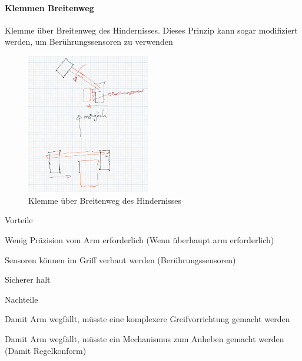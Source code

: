 \paragraph{Klemmen Breitenweg}
Klemme über Breitenweg des Hindernisses. Dieses Prinzip kann sogar modifiziert
werden, um Berührungssensoren zu verwenden

\begin{figure}[h]
        \centering
        \includegraphics[width=0.48\textwidth]{img/technologierecherche/Aufnahme/Breiterweg_Griff.jpg}
        \caption{Klemme über Breitenweg des Hindernisses}
        \label{img:tech_Breiterweg_Griff}
\end{figure}

\begin{minipage}[t]{0.48\textwidth}
    \begin{items}
          \item [Vorteile]
          \item Wenig Präzision vom Arm erforderlich (Wenn überhaupt arm erforderlich)
          \item Sensoren können im Griff verbaut werden (Berührungssensoren)
          \item Sicherer halt
    \end{items}
\end{minipage}
\hfill
\begin{minipage}[t]{0.48\textwidth}
    \begin{items}
          \item [Nachteile]
          \item Damit Arm wegfällt, müsste eine komplexere Greifvorrichtung gemacht werden
          \item Damit Arm wegfällt, müsste ein Mechanismus zum Anheben gemacht werden (Damit Regelkonform)
    \end{items}
\end{minipage}
\newpage
